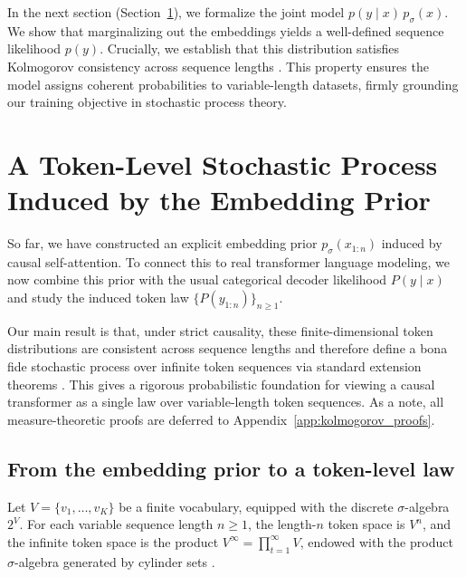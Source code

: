 \documentclass[11pt]{article}
\begin{document}
In the next section (Section~\ref{sec:stochastic_process}), we formalize the joint model $p(y\mid x)\,p_\sigma(x)$. We show that marginalizing out the embeddings yields a well-defined sequence likelihood $p(y)$. Crucially, we establish that this distribution satisfies Kolmogorov consistency across sequence lengths \citep{Billingsley95}. This property ensures the model assigns coherent probabilities to variable-length datasets, firmly grounding our training objective in stochastic process theory.


\section{A Token-Level Stochastic Process Induced by the Embedding Prior}
\label{sec:stochastic_process}

So far, we have constructed an explicit embedding prior $p_\sigma(x_{1:n})$ induced by causal self-attention. To connect this to real transformer language modeling, we now combine this prior with the usual categorical decoder likelihood $P(y\mid x)$ \citep{VaswaniShPaUsJoGoKaPo17,BrownMaRyEtAl20} and study the induced token law $\{P(y_{1:n})\}_{n\ge 1}$.

Our main result is that, under strict causality, these finite-dimensional token distributions are consistent across sequence lengths and therefore define a bona fide stochastic process over infinite token sequences via standard extension theorems \citep{Billingsley95,Kolmogorov33}. This gives a rigorous probabilistic foundation for viewing a causal transformer as a single law over variable-length token sequences. As a note, all measure-theoretic proofs are deferred to Appendix~\ref{app:kolmogorov_proofs}.

\subsection{From the embedding prior to a token-level law}
\label{subsec:token_model_from_prior}

Let $V=\{v_1,\dots,v_K\}$ be a finite vocabulary, equipped with the discrete $\sigma$-algebra $2^V$. For each variable sequence length $n\ge 1$, the length-$n$ token space is $V^n$, and the infinite token space is the product $V^\infty=\prod_{t=1}^\infty V$, endowed with the product $\sigma$-algebra generated by cylinder sets \citep{Billingsley95}.
\end{document}
